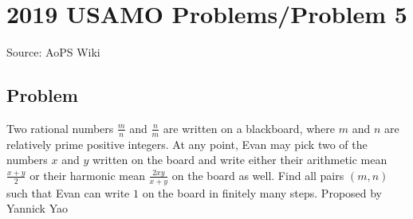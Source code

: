 \documentclass[12pt]{article}
\begin{document}
\section*{{2019 USAMO Problems/Problem 5}}
Source: AoPS Wiki

\subsection*{Problem}
Two rational numbers $\frac{m}{n}$ and $\frac{n}{m}$ are written on a blackboard, where $m$ and $n$ are relatively prime positive integers. At any point, Evan may pick two of the numbers $x$ and $y$ written on the board and write either their arithmetic mean $\frac{x+y}{2}$ or their harmonic mean $\frac{2xy}{x+y}$ on the board as well. Find all pairs $(m,n)$ such that Evan can write $1$ on the board in finitely many steps. Proposed by Yannick Yao
\end{document}
